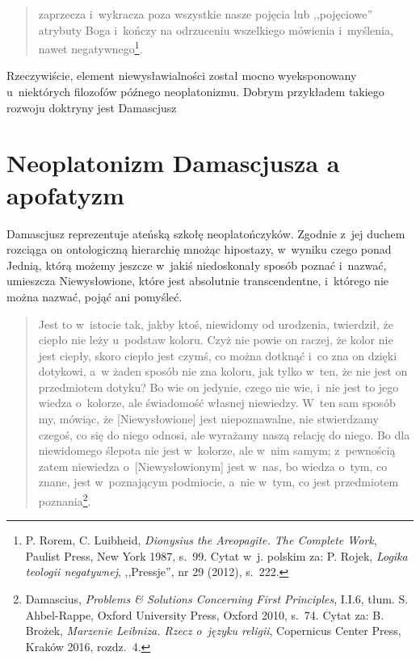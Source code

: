 \begin{quote}
zaprzecza i~wykracza poza wszystkie nasze pojęcia lub ,,pojęciowe'' atrybuty Boga i~kończy na odrzuceniu wszelkiego mówienia i~myślenia, nawet negatywnego\footnote{P. Rorem, C. Luibheid, \textit{Dionysius the Areopagite. The Complete Work}, Paulist Press, New York 1987, s.~99. Cytat w~j. polskim za: P. Rojek, \textit{Logika teologii negatywnej}, ,,Pressje'', nr 29 (2012), s.~222.}.
\end{quote}

Rzeczywiście, element niewysławialności został mocno wyeksponowany u~niektórych filozofów późnego neoplatonizmu. Dobrym przykładem takiego rozwoju doktryny jest Damascjusz

\section{Neoplatonizm Damascjusza a apofatyzm}

Damascjusz reprezentuje ateńską szkołę neoplatończyków. Zgodnie z~jej duchem rozciąga on ontologiczną hierarchię mnożąc hipostazy, w~wyniku czego ponad Jednią, którą możemy jeszcze w~jakiś niedoskonały sposób poznać i~nazwać, umieszcza Niewysłowione, które jest absolutnie transcendentne, i~którego nie można nazwać, pojąć ani pomyśleć.

\begin{quote}
Jest to w~istocie tak, jakby ktoś, niewidomy od urodzenia, twierdził, że ciepło nie leży u~podstaw koloru. Czyż nie powie on raczej, że kolor nie jest ciepły, skoro ciepło jest czymś, co można dotknąć i~co zna on dzięki dotykowi, a~w żaden sposób nie zna koloru, jak tylko w~ten, że nie jest on przedmiotem dotyku? Bo wie on jedynie, czego nie wie, i~nie jest to jego wiedza o~kolorze, ale świadomość własnej niewiedzy. W~ten sam sposób my, mówiąc, że [Niewysłowione] jest niepoznawalne, nie stwierdzamy czegoś, co się do niego odnosi, ale wyrażamy naszą relację do niego. Bo dla niewidomego ślepota nie jest w~kolorze, ale w~nim samym; z~pewnością zatem niewiedza o~[Niewysłowionym] jest w~nas, bo wiedza o~tym, co znane, jest w~poznającym podmiocie, a~nie w~tym, co jest przedmiotem poznania\footnote{Damascius, \textit{Problems \& Solutions Concerning First Principles}, I.I.6, tłum. S. Ahbel-Rappe, Oxford University Press, Oxford 2010, s.~74. Cytat za: B. Brożek, \textit{Marzenie Leibniza. Rzecz o~języku religii}, Copernicus Center Press, Kraków 2016, rozdz.~4.}.
\end{quote}

